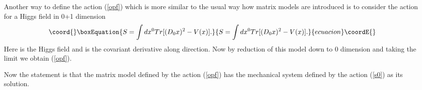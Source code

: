 \documentclass[a4paper,11pt]{article}
\begin{document}
Another way to define the action (\ref{opf}) which is more similar
to the usual way how matrix models are introduced is to consider
the action for a Higgs field in 0+1 dimension
\begin{equation}\coord{}\boxEquation{
S=\int d x^0 Tr[(D_0x)^2-V(x)]. \label{higgs}
}{
S=\int d x^0 Tr[(D_0x)^2-V(x)]. }{ecuacion}\coordE{}\end{equation}
Here \coordHE{} is the \coordHE{} Higgs field and \coordHE{}
is the \coordHE{} covariant derivative along \coordHE{} direction. Now by
reduction of this model down to  0 dimension and taking the limit
\coordHE{} we obtain (\ref{opf}).

 Now the statement is that the matrix model defined by the action (\ref{opf})
 has the mechanical system defined by the action (\ref{s0}) as its solution.
\end{document}
